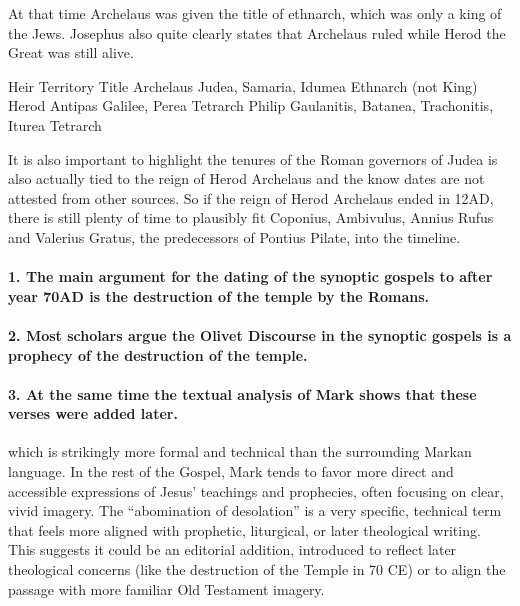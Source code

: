 At that time Archelaus was given the title of ethnarch, which was only a king of the Jews.
Josephus also quite clearly states that Archelaus ruled while Herod the Great was still alive.

Heir Territory Title Archelaus Judea, Samaria, Idumea Ethnarch (not King) Herod Antipas Galilee, Perea Tetrarch Philip Gaulanitis, Batanea, Trachonitis, Iturea Tetrarch

It is also important to highlight the tenures of the Roman governors of Judea is also actually tied to the reign of Herod Archelaus and the know dates are not attested from other sources.
So if the reign of Herod Archelaus ended in 12AD, there is still plenty of time to plausibly fit Coponius, Ambivulus, Annius Rufus and Valerius Gratus, the predecessors of Pontius Pilate, into the timeline.

\paragraph{1.
The main argument for the dating of the synoptic gospels to after year 70AD is the destruction of the temple by the Romans.}\label{par:the-main-argument-for-the-dating-of-the-synoptic-gospels-to-after-year-70ad-is-the-destruction-of-the-temple-by-the-romans.}

\paragraph{2.
Most scholars argue the Olivet Discourse in the synoptic gospels is a prophecy of the destruction of the temple.}\label{par:most-scholars-argue-the-olivet-discourse-in-the-synoptic-gospels-is-a-prophecy-of-the-destruction-of-the-temple.}

\paragraph{3.
At the same time the textual analysis of Mark shows that these verses were added later.}\label{par:at-the-same-time-the-textual-analysis-of-mark-shows-that-these-verses-were-added-later.}

which is strikingly more formal and technical than the surrounding Markan language.
In the rest of the Gospel, Mark tends to favor more direct and accessible expressions of Jesus' teachings and prophecies, often focusing on clear, vivid imagery.
The ``abomination of desolation'' is a very specific, technical term that feels more aligned with prophetic, liturgical, or later theological writing.
This suggests it could be an editorial addition, introduced to reflect later theological concerns (like the destruction of the Temple in 70 CE) or to align the passage with more familiar Old Testament imagery.

